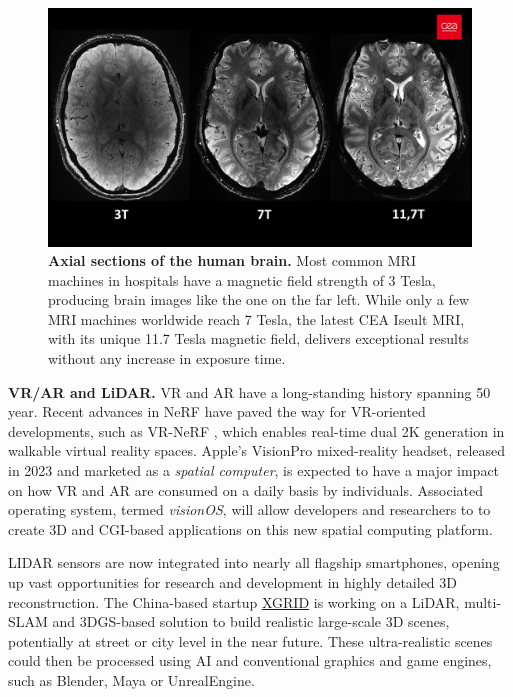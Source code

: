 \begin{figure}[htb!]
  \center
\includegraphics[width=\linewidth]{images/conclusion/cea-iseult.jpg}
\caption{\textbf{Axial sections of the human brain.} Most common MRI machines in hospitals have a magnetic field strength of 3 Tesla, producing brain images like the one on the far left. While only a few MRI machines worldwide reach 7 Tesla, the latest CEA Iseult MRI, with its unique 11.7 Tesla magnetic field, delivers exceptional results without any increase in exposure time.}
\label{fig:conclusion-ceaiseult}
\end{figure}


\noindent \textbf{VR/AR and LiDAR.} \ac{VR} and \ac{AR} have a long-standing history spanning 50 year. Recent advances in \ac{NeRF} have paved the way for \ac{VR}-oriented developments, such as VR-NeRF \citep{xu2023vr}, which enables real-time dual 2K generation in walkable virtual reality spaces. Apple's VisionPro mixed-reality headset, released in 2023 and marketed as a \textit{spatial computer}, is expected to have a major impact on how \ac{VR} and \ac{AR} are consumed on a daily basis by individuals. Associated operating system, termed \textit{visionOS}, will allow developers and researchers to to create 3D and \ac{CGI}-based applications on this new spatial computing platform.

LIDAR sensors are now integrated into nearly all flagship smartphones, opening up vast opportunities for research and development in highly detailed 3D reconstruction. The China-based startup \href{https://www.xgrids.com/}{XGRID} is working on a \ac{LiDAR}, multi-\ac{SLAM} and 3D\ac{GS}-based solution to build realistic large-scale 3D scenes, potentially at street or city level in the near future. These ultra-realistic scenes could then be processed using \ac{AI} and conventional graphics and game engines, such as Blender, Maya or UnrealEngine. 

